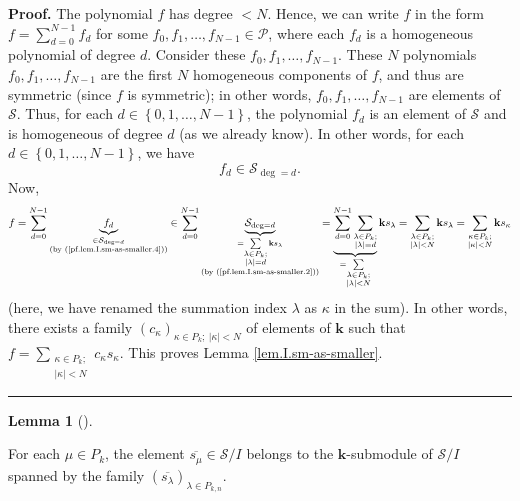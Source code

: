 \documentclass[numbers=enddot,12pt,final,onecolumn,notitlepage]{scrartcl}%
\theoremstyle{definition}
\newtheorem{lem}[theo]{Lemma}
\newenvironment{lemma}[1][]
{\begin{lem}[#1]\begin{leftbar}}
{\end{leftbar}\end{lem}}
\newenvironment{proof}[1][Proof]{\noindent\textbf{#1.} }{\ \rule{0.5em}{0.5em}}
\let\sumnonlimits\sum
\renewcommand{\sum}{\sumnonlimits\limits}
\begin{document}
\begin{proof}
The polynomial $f$ has degree $<N$. Hence, we can write $f$ in the form
$f=\sum_{d=0}^{N-1}f_{d}$ for some $f_{0},f_{1},\ldots,f_{N-1}\in\mathcal{P}$,
where each $f_{d}$ is a homogeneous polynomial of degree $d$. Consider these
$f_{0},f_{1},\ldots,f_{N-1}$. These $N$ polynomials $f_{0},f_{1}%
,\ldots,f_{N-1}$ are the first $N$ homogeneous components of $f$, and thus are
symmetric (since $f$ is symmetric); in other words, $f_{0},f_{1}%
,\ldots,f_{N-1}$ are elements of $\mathcal{S}$. Thus, for each $d\in\left\{
0,1,\ldots,N-1\right\}  $, the polynomial $f_{d}$ is an element of
$\mathcal{S}$ and is homogeneous of degree $d$ (as we already know). In other
words, for each $d\in\left\{  0,1,\ldots,N-1\right\}  $, we have%
\begin{equation}
f_{d}\in\mathcal{S}_{\deg=d}. \label{pf.lem.I.sm-as-smaller.4}%
\end{equation}
Now,
\[
f=\sum_{d=0}^{N-1}\underbrace{f_{d}}_{\substack{\in\mathcal{S}_{\deg
=d}\\\text{(by (\ref{pf.lem.I.sm-as-smaller.4}))}}}\in\sum_{d=0}%
^{N-1}\underbrace{\mathcal{S}_{\deg=d}}_{\substack{=\sum_{\substack{\lambda\in
P_{k};\\\left\vert \lambda\right\vert =d}}\mathbf{k}s_{\lambda}\\\text{(by
(\ref{pf.lem.I.sm-as-smaller.2}))}}}=\underbrace{\sum_{d=0}^{N-1}%
\sum_{\substack{\lambda\in P_{k};\\\left\vert \lambda\right\vert =d}}}%
_{=\sum_{\substack{\lambda\in P_{k};\\\left\vert \lambda\right\vert <N}%
}}\mathbf{k}s_{\lambda}=\sum_{\substack{\lambda\in P_{k};\\\left\vert
\lambda\right\vert <N}}\mathbf{k}s_{\lambda}=\sum_{\substack{\kappa\in
P_{k};\\\left\vert \kappa\right\vert <N}}\mathbf{k}s_{\kappa}%
\]
(here, we have renamed the summation index $\lambda$ as $\kappa$ in the sum).
In other words, there exists a family $\left(  c_{\kappa}\right)  _{\kappa\in
P_{k};\ \left\vert \kappa\right\vert <N}$ of elements of $\mathbf{k}$ such
that $f=\sum_{\substack{\kappa\in P_{k};\\\left\vert \kappa\right\vert
<N}}c_{\kappa}s_{\kappa}$. This proves Lemma \ref{lem.I.sm-as-smaller}.
\end{proof}

\begin{lemma}
\label{lem.I.sl-red2}For each $\mu\in P_{k}$, the element $\overline{s_{\mu}%
}\in\mathcal{S}/I$ belongs to the $\mathbf{k}$-submodule of $\mathcal{S}/I$
spanned by the family $\left(  \overline{s_{\lambda}}\right)  _{\lambda\in
P_{k,n}}$.
\end{lemma}
\end{document}
